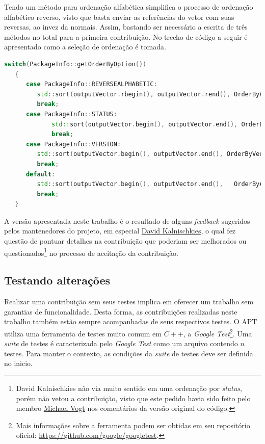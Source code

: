 Tendo um método para ordenação alfabética simplifica o processo de ordenação alfabético reverso, visto que basta enviar as referências do vetor com suas reversas, ao invez da normais. Assim, bastando ser necessário a escrita de três métodos no total para a primeira contribuição. No trecho de código a seguir é apresentado como a seleção de ordenação é tomada.


\begin{lstlisting}[language=C++,label=choose_pr1,caption={Tomada de decisão de ordenação}]
   switch(PackageInfo::getOrderByOption())
   {
      case PackageInfo::REVERSEALPHABETIC:
		 std::sort(outputVector.rbegin(), outputVector.rend(), OrderByAlphabetic);
		 break;
      case PackageInfo::STATUS:
			 std::sort(outputVector.begin(), outputVector.end(), OrderByStatus);
			 break;
      case PackageInfo::VERSION:
		 std::sort(outputVector.begin(), outputVector.end(), OrderByVersion);
		 break;
      default:
		 std::sort(outputVector.begin(), outputVector.end(),   OrderByAlphabetic);
		 break;
   }
\end{lstlisting}

A versão apresentada neste trabalho é o resultado de alguns \textit{feedback} sugeridos pelos mantenedores do projeto, em especial \href{https://github.com/DonKult}{David Kalnischkies}, o qual fez questão de pontuar detalhes na contribuição que poderiam ser melhorados ou questionados\footnote{David Kalnischkies não via muito sentido em uma ordenação por \textit{status}, porém não vetou a contribuição, visto que este pedido havia sido feito pelo membro \href{https://github.com/mvo5}{Michael Vogt} nos comentários da versão original do código.} no processo de aceitação da contribuição.


\subsection*{Testando alterações} %

Realizar uma contribuição sem seus testes implica em oferecer um trabalho sem garantias de funcionalidade. Desta forma, as contribuições realizadas neste trabalho também estão sempre acompanhadas de seus respectivos testes. O {\code APT} utiliza uma ferramenta de testes muito comum em $C++$, a \textit{Google Test}\footnote{Mais informações sobre a ferramenta podem ser obtidas em seu repositório oficial: \url{https://github.com/google/googletest}.}. Uma \textit{suite} de testes é caracterizada pelo \textit{Google Test} como um arquivo contendo $n$ testes. Para manter o contexto, as condições da \textit{suite} de testes deve ser definida no inicio.

